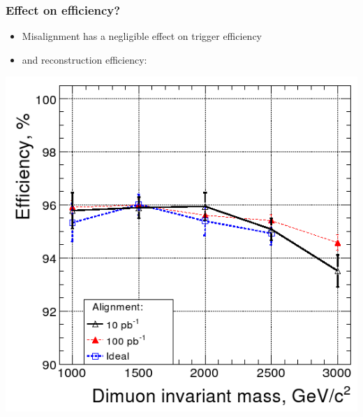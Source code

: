\documentclass[compress]{beamer}
\begin{document}
\begin{frame}
\frametitle{Effect on efficiency?}

\begin{itemize}
\item Misalignment has a negligible effect on trigger efficiency
\item and reconstruction efficiency:
\end{itemize}

\begin{center}
\includegraphics[width=0.6\linewidth]{reconstruction_efficiency.png}
\end{center}
\end{frame}
\end{document}
